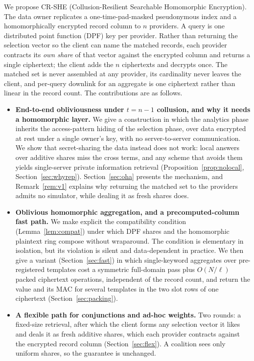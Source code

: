 \documentclass[a4paper,fleqn]{cas-dc}
\begin{document}
We propose CR-SHE (Collusion-Resilient Searchable Homomorphic Encryption). The
data owner replicates a one-time-pad-masked pseudonymous index and a
homomorphically encrypted record column to $n$ providers. A query is one
distributed point function (DPF) key per provider. Rather than returning the
selection vector so the client can name the matched records, each provider
contracts its \emph{own share} of that vector against the encrypted column and
returns a single ciphertext; the client adds the $n$ ciphertexts and decrypts
once. The matched set is never assembled at any provider, its cardinality
never leaves the client, and per-query downlink for an aggregate is one
ciphertext rather than linear in the record count. The contributions are as
follows.

\begin{itemize}
\item \textbf{End-to-end obliviousness under $t=n-1$ collusion, and why it
needs a homomorphic layer.} We give a construction in which the analytics
phase inherits the access-pattern hiding of the selection phase, over data
encrypted at rest under a single owner's key, with no server-to-server
communication. We show that secret-sharing the data instead does not work:
local answers over additive shares miss the cross terms, and any scheme that
avoids them yields single-server private information retrieval
(Proposition~\ref{prop:nolocal}, Section~\ref{sec:whyrep}).
Section~\ref{sec:oha} presents the mechanism, and Remark~\ref{rem:v1}
explains why returning the matched set to the providers admits no simulator,
while dealing it as fresh shares does.

\item \textbf{Oblivious homomorphic aggregation, and a precomputed-column fast
path.} We make explicit the compatibility condition (Lemma~\ref{lem:compat})
under which DPF shares and the homomorphic plaintext ring compose without
wraparound. The condition is elementary in isolation, but its violation is
silent and data-dependent in practice. We then give a variant
(Section~\ref{sec:fast}) in which single-keyword aggregates over pre-registered
templates cost a symmetric full-domain pass plus $O(N/\ell)$ packed ciphertext
operations, independent of the record count, and return the value and its MAC
for several templates in the two slot rows of one ciphertext
(Section~\ref{sec:packing}).

\item \textbf{A flexible path for conjunctions and ad-hoc weights.} Two rounds:
a fixed-size retrieval, after which the client forms any selection vector it
likes and deals it as fresh additive shares, which each provider contracts
against the encrypted record column (Section~\ref{sec:flex}). A coalition sees
only uniform shares, so the guarantee is unchanged.


\end{itemize}
\end{document}

